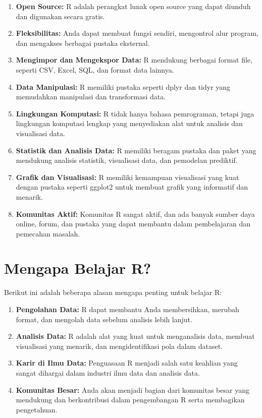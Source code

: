 \documentclass[
]{book}
\providecommand{\tightlist}{%
  \setlength{\itemsep}{0pt}\setlength{\parskip}{0pt}}
\begin{document}
\begin{enumerate}
\def\labelenumi{\arabic{enumi}.}
\tightlist
\item
  \textbf{Open Source:} R adalah perangkat lunak open source yang dapat diunduh dan digunakan secara gratis.
\item
  \textbf{Fleksibilitas:} Anda dapat membuat fungsi sendiri, mengontrol alur program, dan mengakses berbagai pustaka eksternal.
\item
  \textbf{Mengimpor dan Mengekspor Data:} R mendukung berbagai format file, seperti CSV, Excel, SQL, dan format data lainnya.
\item
  \textbf{Data Manipulasi:} R memiliki pustaka seperti dplyr dan tidyr yang memudahkan manipulasi dan transformasi data.
\item
  \textbf{Lingkungan Komputasi:} R tidak hanya bahasa pemrograman, tetapi juga lingkungan komputasi lengkap yang menyediakan alat untuk analisis dan visualisasi data.
\item
  \textbf{Statistik dan Analisis Data:} R memiliki beragam pustaka dan paket yang mendukung analisis statistik, visualisasi data, dan pemodelan prediktif.
\item
  \textbf{Grafik dan Visualisasi:} R memiliki kemampuan visualisasi yang kuat dengan pustaka seperti ggplot2 untuk membuat grafik yang informatif dan menarik.
\item
  \textbf{Komunitas Aktif:} Komunitas R sangat aktif, dan ada banyak sumber daya online, forum, dan pustaka yang dapat membantu dalam pembelajaran dan pemecahan masalah.
\end{enumerate}

\hypertarget{mengapa-belajar-r}{%
\section{Mengapa Belajar R?}\label{mengapa-belajar-r}}

Berikut ini adalah beberapa alasan mengapa penting untuk belajar R:

\begin{enumerate}
\def\labelenumi{\arabic{enumi}.}
\tightlist
\item
  \textbf{Pengolahan Data:} R dapat membantu Anda membersihkan, merubah format, dan mengolah data sebelum analisis lebih lanjut.
\item
  \textbf{Analisis Data:} R adalah alat yang kuat untuk menganalisis data, membuat visualisasi yang menarik, dan mengidentifikasi pola dalam dataset.
\item
  \textbf{Karir di Ilmu Data:} Penguasaan R menjadi salah satu keahlian yang sangat dihargai dalam industri ilmu data dan analisis data.
\item
  \textbf{Komunitas Besar:} Anda akan menjadi bagian dari komunitas besar yang mendukung dan berkontribusi dalam pengembangan R serta membagikan pengetahuan.
\end{enumerate}
\end{document}
